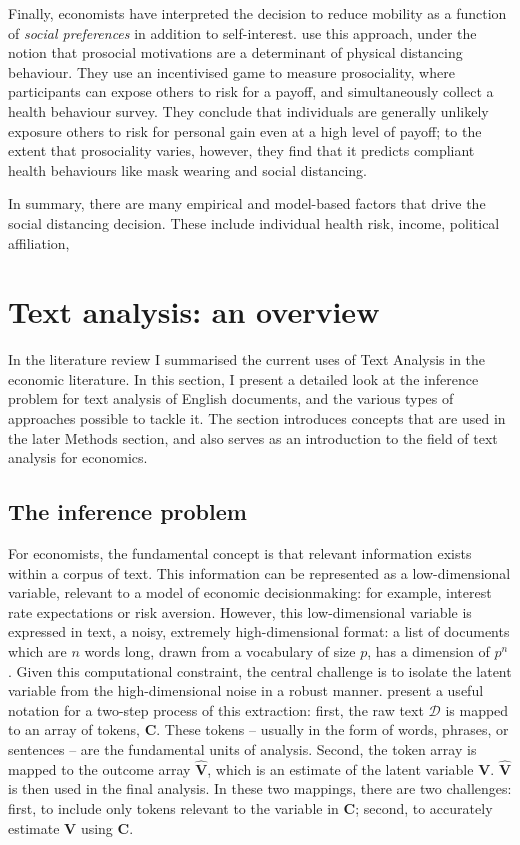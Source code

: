 \documentclass{article}
\begin{document}
Finally, economists have interpreted the decision to reduce mobility as a function of \textit{social preferences} \parencite{fehrTheoryFairnessCompetition1999} in addition to self-interest. \textcite{campos-mercadeProsocialityPredictsHealth2021} use this approach, under the notion that prosocial motivations are a determinant of physical distancing behaviour. They use an incentivised game to measure prosociality, where participants can expose others to risk for a payoff, and simultaneously collect a health behaviour survey. They conclude that individuals are generally unlikely exposure others to risk for personal gain even at a high level of payoff; to the extent that prosociality varies, however, they find that it predicts compliant health behaviours like mask wearing and social distancing. 

In summary, there are many empirical and model-based factors that drive the social distancing decision. These include individual health risk, income, political affiliation, 
\section{Text analysis: an overview}\label{textan}
In the literature review I summarised the current uses of Text Analysis in the economic literature. In this section, I present a detailed look at the inference problem for text analysis of English documents, and the various types of approaches possible to tackle it. The section introduces concepts that are used in the later Methods section, and also serves as an introduction to the field of text analysis for economics.
\subsection{The inference problem}
For economists, the fundamental concept is that relevant information exists within a corpus of text. This information can be represented as a low-dimensional variable, relevant to a model of economic decisionmaking: for example, interest rate expectations or risk aversion. However, this low-dimensional variable is expressed in text, a noisy, extremely high-dimensional format: a list of documents which are \(n\) words long, drawn from a vocabulary of size \(p\), has a dimension of \(p^n\). Given this computational constraint, the central challenge is to isolate the latent variable from the high-dimensional noise in a robust manner.  \textcite{gentzkowTextData2019} present a useful notation for a two-step process of this extraction: first, the raw text \(\mathcal{D}\) is mapped to an array of tokens, \(\mathbf{C}\). These tokens -- usually in the form of words, phrases, or sentences -- are the fundamental units of analysis. Second, the token array is mapped to the outcome array \(\hat{\mathbf{V}}\), which is an estimate of the latent variable \(\mathbf{V}\). \(\hat{\mathbf{V}} \) is then used in the final analysis. In these two mappings, there are two challenges: first, to include only tokens relevant to the variable in \(\mathbf{C}\); second, to accurately estimate  \(\mathbf{V} \) using \(\mathbf{C}\). 
\end{document}
